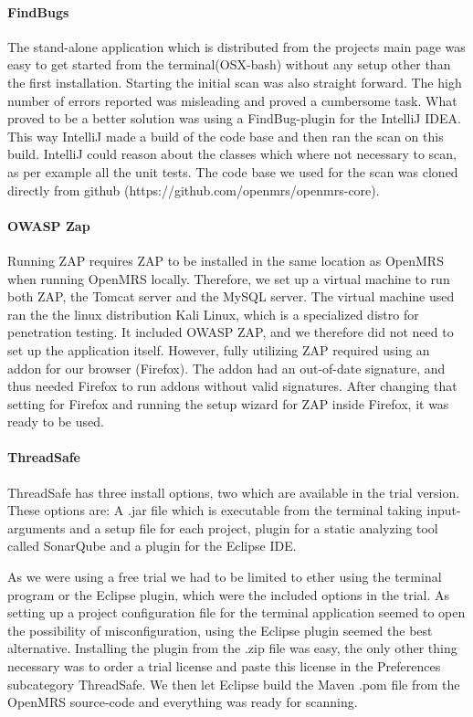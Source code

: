 \documentclass{report} %
\begin{document}
\paragraph{FindBugs}

The stand-alone application which is distributed from the projects main page was
easy to get started from the terminal(OSX-bash) without any setup other than the
first installation. Starting the initial scan was also straight forward. The
high number of errors reported was misleading and proved a cumbersome task. What
proved to be a better solution was using a FindBug-plugin for the IntelliJ IDEA.
This way IntelliJ made a build of the code base and then ran the scan on this
build. IntelliJ could reason about the classes which where not necessary
to scan, as per example all the unit tests. The code base we used for the scan was
cloned directly from github (https://github.com/openmrs/openmrs-core).

\paragraph{OWASP Zap}

Running ZAP requires ZAP to be installed in the same location as OpenMRS when
running OpenMRS locally. Therefore, we set up a virtual machine to run both ZAP,
the Tomcat server and the MySQL server. The virtual machine used ran the the
linux distribution Kali Linux, which is a specialized distro for penetration
testing. It included OWASP ZAP, and we therefore did not need to set up the
application itself. However, fully utilizing ZAP required using an addon for our
browser (Firefox). The addon had an out-of-date signature, and thus needed
Firefox to run addons without valid signatures. After changing that setting for
Firefox and running the setup wizard for ZAP inside Firefox, it was ready to be used.

\paragraph{ThreadSafe} %

ThreadSafe has three install options, two which are available in the trial
version. These options are: A .jar file which is executable from the terminal
taking input-arguments and a setup file for each project, plugin for a static
analyzing tool called SonarQube and a plugin for the Eclipse IDE.

As we were using a free trial we had to be limited to ether using the terminal
program or the Eclipse plugin, which were the included options in the trial. As
setting up a project configuration file for the terminal application seemed to
open the possibility of misconfiguration, using the Eclipse plugin seemed the
best alternative. Installing the plugin from the .zip file was easy, the only
other thing necessary was to order a trial license and paste this license in the
Preferences subcategory ThreadSafe. We then let Eclipse build the Maven .pom file from
the OpenMRS source-code and everything was ready for scanning. 
\end{document}
